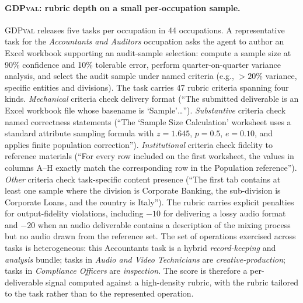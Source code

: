 \documentclass{article}
\begin{document}
\paragraph{\textsc{GDPval}: rubric depth on a small per-occupation sample.}
\textsc{GDPval} releases five tasks per occupation in 44 occupations.
A representative task for the \emph{Accountants and Auditors} occupation asks the agent to author an Excel workbook supporting an audit-sample selection: compute a sample size at 90\% confidence and 10\% tolerable error, perform quarter-on-quarter variance analysis, and select the audit sample under named criteria (e.g., $>20\%$ variance, specific entities and divisions).
The task carries 47 rubric criteria spanning four kinds.
\emph{Mechanical} criteria check delivery format (``The submitted deliverable is an Excel workbook file whose basename is `Sample'\ldots'').
\emph{Substantive} criteria check named correctness statements (``The `Sample Size Calculation' worksheet uses a standard attribute sampling formula with $z=1.645$, $p=0.5$, $e=0.10$, and applies finite population correction'').
\emph{Institutional} criteria check fidelity to reference materials (``For every row included on the first worksheet, the values in columns A--H exactly match the corresponding row in the Population reference'').
\emph{Other} criteria check task-specific content presence (``The first tab contains at least one sample where the division is Corporate Banking, the sub-division is Corporate Loans, and the country is Italy'').
The rubric carries explicit penalties for output-fidelity violations, including $-10$ for delivering a lossy audio format and $-20$ when an audio deliverable contains a description of the mixing process but no audio drawn from the reference set.
The set of operations exercised across tasks is heterogeneous: this Accountants task is a hybrid \emph{record-keeping} and \emph{analysis} bundle; tasks in \emph{Audio and Video Technicians} are \emph{creative-production}; tasks in \emph{Compliance Officers} are \emph{inspection}.
The score is therefore a per-deliverable signal computed against a high-density rubric, with the rubric tailored to the task rather than to the represented operation.
\end{document}
